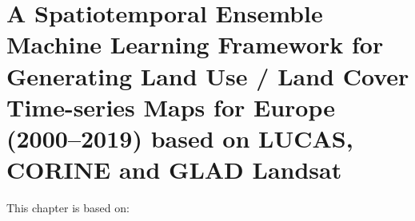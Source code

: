 \chapter[A Spatiotemporal Ensemble Machine Learning Framework for Generating Land Use / Land Cover Time-series Maps for Europe (2000--2019) based on LUCAS, CORINE and GLAD Landsat]{A Spatiotemporal Ensemble Machine Learning Framework for Generating Land Use / Land Cover Time-series Maps for Europe (2000--2019) based on LUCAS, CORINE and GLAD Landsat}
\label{cha:chapter2}
\vspace*{\fill}
This chapter is based on:
\\
\\
\newpage

